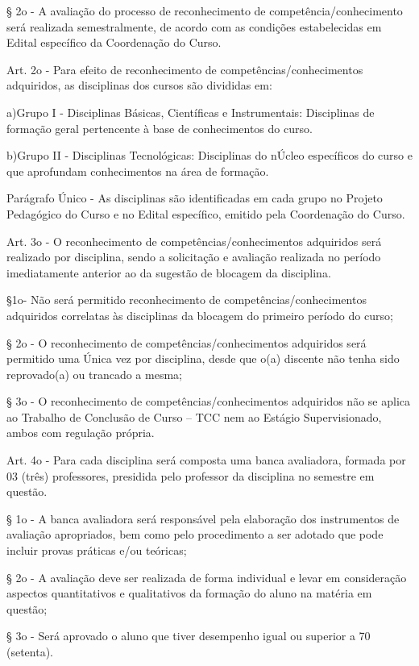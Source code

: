 	§ 2o - A avaliação do processo de reconhecimento de competência/conhecimento será realizada semestralmente, de acordo com as condições estabelecidas em Edital específico da Coordenação do Curso.

	Art. 2o - Para efeito de reconhecimento de competências/conhecimentos adquiridos, as disciplinas dos cursos são divididas em:
	
	a)Grupo I - Disciplinas Básicas, Científicas e Instrumentais: Disciplinas de formação geral pertencente à base de conhecimentos do curso.
	
	b)Grupo II - Disciplinas Tecnológicas: Disciplinas do nÚcleo específicos do curso e que aprofundam conhecimentos na área de formação.
	
	Parágrafo Único - As disciplinas são identificadas em cada grupo no Projeto Pedagógico do Curso e no Edital específico, emitido pela Coordenação do Curso.
	
	Art. 3o - O reconhecimento de competências/conhecimentos adquiridos será realizado por disciplina, sendo a solicitação e avaliação realizada no período imediatamente anterior ao da sugestão de blocagem da disciplina.
	
	§1o- Não será permitido reconhecimento de competências/conhecimentos adquiridos correlatas às disciplinas da blocagem do primeiro período do curso;
	
	§ 2o - O reconhecimento de competências/conhecimentos adquiridos será permitido uma Única vez por disciplina, desde que o(a) discente não tenha sido reprovado(a) ou trancado a mesma;
	
	§ 3o - O reconhecimento de competências/conhecimentos adquiridos não se aplica ao Trabalho de Conclusão de Curso – TCC nem ao Estágio Supervisionado, ambos com regulação própria.
	
	Art. 4o - Para cada disciplina será composta uma banca avaliadora, formada por 03 (três) professores, presidida pelo professor da disciplina no semestre em questão.
	
	§ 1o - A banca avaliadora será responsável pela elaboração dos instrumentos de avaliação apropriados, bem como pelo procedimento a ser adotado que pode incluir provas práticas e/ou teóricas;
	
	§ 2o - A avaliação deve ser realizada de forma individual e levar em consideração aspectos quantitativos e qualitativos da formação do aluno na matéria em questão;
	
	§ 3o - Será aprovado o aluno que tiver desempenho igual ou superior a 70 (setenta).
	
